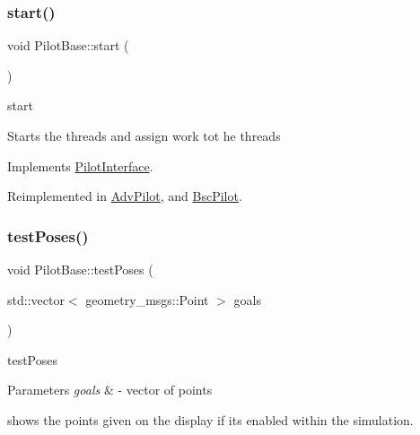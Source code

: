 \mbox{\label{classPilotBase_a3480ea2023ca1459b32b79abf8a3400d}} 
\subsubsection{\texorpdfstring{start()}{start()}}
{\footnotesize\ttfamily void Pilot\+Base\+::start (\begin{DoxyParamCaption}{ }\end{DoxyParamCaption})\hspace{0.3cm}{\ttfamily [virtual]}}



start 

Starts the threads and assign work tot he threads 

Implements \hyperlink{classPilotInterface_a86f3a427525364eb977fbe0a032fb9f7}{Pilot\+Interface}.



Reimplemented in \hyperlink{classAdvPilot_a8a6c363126dc017d6b3e2ca8cc761117}{Adv\+Pilot}, and \hyperlink{classBscPilot_a121a0ff2e9fc49b68d344d6785703702}{Bsc\+Pilot}.

\mbox{\label{classPilotBase_a9245c4ef3c141166169a1f43aa61af3a}} 
\subsubsection{\texorpdfstring{test\+Poses()}{testPoses()}}
{\footnotesize\ttfamily void Pilot\+Base\+::test\+Poses (\begin{DoxyParamCaption}\item[{std\+::vector$<$ geometry\+\_\+msgs\+::\+Point $>$}]{goals }\end{DoxyParamCaption})\hspace{0.3cm}{\ttfamily [protected]}}



test\+Poses 


\begin{DoxyParams}{Parameters}
{\em goals} & -\/ vector of points\\
\hline
\end{DoxyParams}
shows the points given on the display if its enabled within the simulation. 

